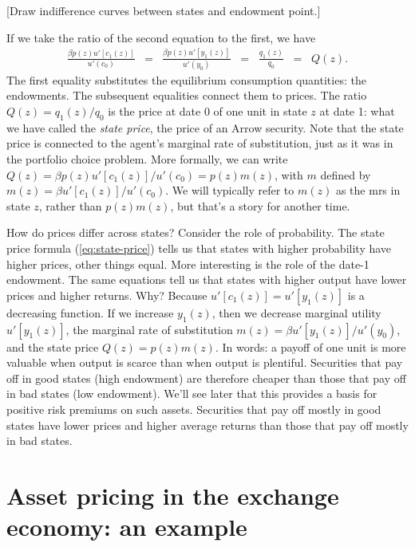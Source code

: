 \documentclass[11pt]{article}
\begin{document}
[Draw indifference curves between states and endowment point.]

If we take the ratio of the second equation to the first,
we have
\begin{eqnarray}
    \frac{\beta p(z) u'[c_1(z)]}{u'(c_0)} &=&
    \frac{\beta p(z) u'[y_1(z)]}{u'(y_0)}
    \;\;=\;\; \frac{q_1(z)}{q_0} \;\;=\;\; Q(z) .
    \label{eq:state-price}
\end{eqnarray}
The first equality substitutes the equilibrium consumption quantities:
the endowments.
The subsequent equalities connect them to prices.
The ratio $Q(z) = q_1(z)/q_0$ is the price at date 0 of one unit in state $z$ at date 1:
what we have called the {\it state price\/}, the price of an Arrow security.
Note that the state price is connected to the agent's marginal rate of substitution,
just as it was in the portfolio choice problem.
More formally, we can write
$ Q(z) = \beta p(z) u'[c_1(z)]/u'(c_0) = p(z) m(z) $,
with $m$ defined by $m(z) = \beta u'[c_1(z)]/u'(c_0)$.
We will typically refer to $m(z)$ as the mrs in state $z$,
rather than $p(z) m(z)$, but that's a story for another time.

How do prices differ across states?
Consider the role of probability.
The state price formula (\ref{eq:state-price})
tells us that states with higher probability have higher prices,
other things equal.
More interesting is the role of the date-1 endowment.
The same equations tell us that states with higher output have lower prices
and higher returns.
Why?  Because $u'[c_1(z)] = u'[y_1(z)]$ is a decreasing function.
If we increase $y_1(z)$, then we decrease marginal utility $u'[y_1(z)]$,
the marginal rate of substitution $m(z) = \beta u'[y_1(z)]/u'(y_0)$,
and the state price $Q(z) = p(z) m(z)$.
In words: a payoff of one unit is more valuable when output is scarce
than when output is plentiful.
Securities that pay off in good states (high endowment) are therefore
cheaper than those that pay off in bad states (low endowment).
We'll see later that this provides a basis for positive risk premiums on such assets.
Securities that pay off mostly in good states have lower prices
and higher average returns than those that pay off mostly in bad states.



\section{Asset pricing in the exchange economy: an example}
\end{document}
